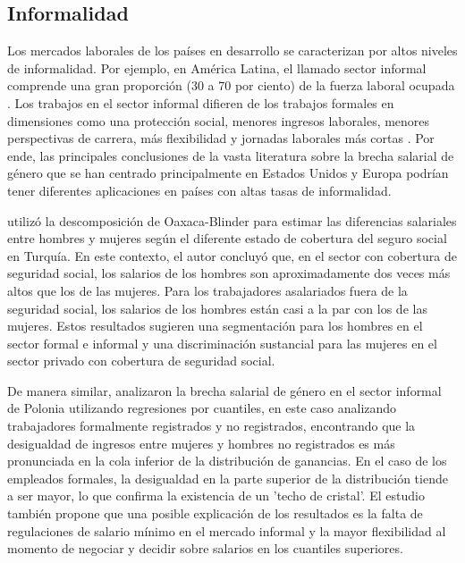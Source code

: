 \subsection{Informalidad}
Los mercados laborales de los países en desarrollo se caracterizan por altos niveles de informalidad. Por ejemplo, en América Latina, el llamado sector informal comprende una gran proporción (30 a 70 por ciento) de la fuerza laboral ocupada \citep{Maloney2004}. Los trabajos en el sector informal difieren de los trabajos formales en dimensiones como una protección social, menores ingresos laborales, menores perspectivas de carrera, más flexibilidad y jornadas laborales más cortas \citep{Berniell2019}. Por ende, las principales conclusiones de la vasta literatura sobre la brecha salarial de género que se han centrado principalmente en Estados Unidos y Europa podrían tener diferentes aplicaciones en países con altas tasas de informalidad.

\citet{Tansel2001} utilizó la descomposición de Oaxaca-Blinder para estimar las diferencias salariales entre hombres y mujeres según el diferente estado de cobertura del seguro social en Turquía. En este contexto, el autor concluyó que, en el sector con cobertura de seguridad social, los salarios de los hombres son aproximadamente dos veces más altos que los de las mujeres. Para los trabajadores asalariados fuera de la seguridad social, los salarios de los hombres están casi a la par con los de las mujeres. Estos resultados sugieren una segmentación para los hombres en el sector formal e informal y una discriminación sustancial para las mujeres en el sector privado con cobertura de seguridad social.

De manera similar, \citet{Ruzik2010} analizaron la brecha salarial de género en el sector informal de Polonia utilizando regresiones por cuantiles, en este caso analizando trabajadores formalmente registrados y no registrados, encontrando que la desigualdad de ingresos entre mujeres y hombres no registrados es más pronunciada en la cola inferior de la distribución de ganancias. En el caso de los empleados formales, la desigualdad en la parte superior de la distribución tiende a ser mayor, lo que confirma la existencia de un 'techo de cristal'. El estudio también propone que una posible explicación de los resultados es la falta de regulaciones de salario mínimo en el mercado informal y la mayor flexibilidad al momento de negociar y decidir sobre salarios en los cuantiles superiores.

